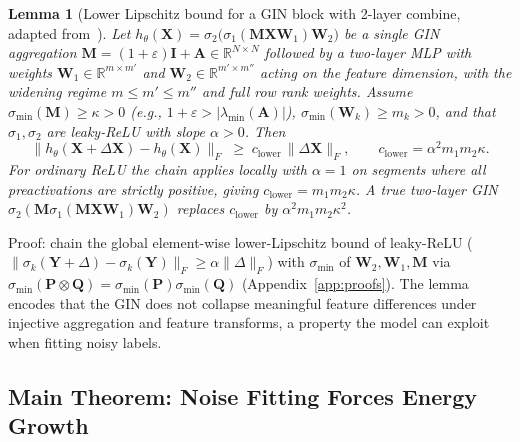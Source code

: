\documentclass{article}
\newtheorem{lemma}{Lemma}
\theoremstyle{definition}
\begin{document}
\begin{lemma}[Lower Lipschitz bound for a GIN block with 2-layer combine, adapted from~\citealp{chuang2022tree, davidson2024h, juvina2024training}]
\label{lem:bilip}
Let $h_\theta(\mathbf{X})=\sigma_2\bigl(\sigma_1(\mathbf{M}\mathbf{X}\mathbf{W}_1)\mathbf{W}_2\bigr)$ be a single GIN aggregation $\mathbf{M}=(1+\varepsilon)\mathbf{I}+\mathbf{A}\in\mathbb{R}^{N\times N}$ followed by a two-layer MLP with weights $\mathbf{W}_1\in\mathbb{R}^{m\times m'}$ and $\mathbf{W}_2\in\mathbb{R}^{m'\times m''}$ acting on the feature dimension, with the widening regime $m\leq m'\leq m''$ and full row rank weights. Assume $\sigma_{\min}(\mathbf{M})\geq\kappa>0$ (e.g., $1+\varepsilon>|\lambda_{\min}(\mathbf{A})|$), $\sigma_{\min}(\mathbf{W}_k)\geq m_k>0$, and that $\sigma_1,\sigma_2$ are leaky-ReLU with slope $\alpha>0$. Then
\begin{equation}
\|h_\theta(\mathbf{X}+\Delta\mathbf{X})-h_\theta(\mathbf{X})\|_F\;\geq\;c_{\text{lower}}\,\|\Delta\mathbf{X}\|_F,\qquad c_{\text{lower}}=\alpha^2 m_1 m_2 \kappa.
\label{eq:bilip}
\end{equation}
For ordinary ReLU the chain applies locally with $\alpha=1$ on segments where all preactivations are strictly positive, giving $c_{\text{lower}}=m_1 m_2 \kappa$. A true two-layer GIN $\sigma_2(\mathbf{M}\sigma_1(\mathbf{M}\mathbf{X}\mathbf{W}_1)\mathbf{W}_2)$ replaces $c_{\text{lower}}$ by $\alpha^2 m_1 m_2 \kappa^2$.
\end{lemma}

Proof: chain the global element-wise lower-Lipschitz bound of leaky-ReLU ($\|\sigma_k(\mathbf{Y}+\Delta)-\sigma_k(\mathbf{Y})\|_F\geq\alpha\|\Delta\|_F$) with $\sigma_{\min}$ of $\mathbf{W}_2,\mathbf{W}_1,\mathbf{M}$ via $\sigma_{\min}(\mathbf{P}\otimes\mathbf{Q})=\sigma_{\min}(\mathbf{P})\sigma_{\min}(\mathbf{Q})$ (Appendix~\ref{app:proofs}). The lemma encodes that the GIN does not collapse meaningful feature differences under injective aggregation and feature transforms, a property the model can exploit when fitting noisy labels.

\subsection{Main Theorem: Noise Fitting Forces Energy Growth}
\end{document}
